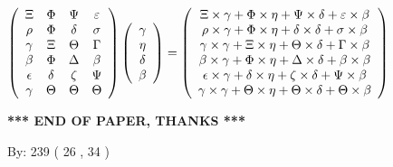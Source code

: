 \documentclass[12pt]{article}
\begin{document}
$  %
 \left( \begin{array}
 {
 c
 c
 c
 c
 }
                    \Xi & 
 \Phi & 
 \Psi & 
 \varepsilon \\ 
 \rho & 
 \Phi & 
 \delta & 
 \sigma \\ 
 \gamma & 
                    \Xi & 
 \Theta & 
 \Gamma \\ 
 \beta & 
 \Phi & 
 \Delta & 
 \beta \\ 
 \epsilon & 
 \delta & 
                    \zeta & 
 \Psi \\ 
 \gamma & 
 \Theta & 
 \Theta & 
 \Theta
 \end{array} \right)
 \left( \begin{array}
 {
 c
 }
 \gamma \\ 
 \eta \\ 
 \delta \\ 
 \beta
 \end{array} \right)
=
  \left( \begin{array}
 {
 c
 }
                    \Xi \times  \gamma   +  \Phi \times  \eta   +  \Psi \times  \delta   +  \varepsilon \times  \beta \\ 
 \rho \times  \gamma   +  \Phi \times  \eta   +  \delta \times  \delta   +  \sigma \times  \beta \\ 
 \gamma \times  \gamma   +                     \Xi \times  \eta   +  \Theta \times  \delta   +  \Gamma \times  \beta \\ 
 \beta \times  \gamma   +  \Phi \times  \eta   +  \Delta \times  \delta   +  \beta \times  \beta \\ 
 \epsilon \times  \gamma   +  \delta \times  \eta   +                     \zeta \times  \delta   +  \Psi \times  \beta \\ 
 \gamma \times  \gamma   +  \Theta \times  \eta   +  \Theta \times  \delta   +  \Theta \times  \beta
 \end{array} \right)
$
 
 
 
   
   
 \vspace{0.2in}
 
   
   
   
   
\vspace{1.0in} 
{\textbf{\large{ *** END OF PAPER, THANKS *** }}} 
   
   
\hspace{1.0in} By: 
 239 ( 26 ,  34 )
   
   
   
\end{document}
